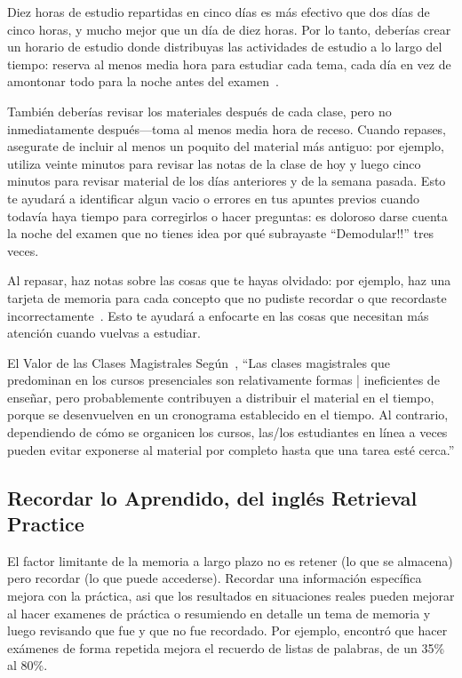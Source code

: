 Diez horas de estudio repartidas en cinco días
es más efectivo que dos días de cinco horas,
y mucho mejor que un día de diez horas.
Por lo tanto, deberías crear un horario de estudio donde distribuyas las actividades de estudio a lo largo del tiempo:
reserva al menos media hora para estudiar cada tema, cada día
en vez de amontonar todo para la noche antes del examen~\cite{Kang2016}.

También deberías revisar los materiales después de cada clase,
pero no inmediatamente después---toma al menos media hora de receso.
Cuando repases,
asegurate de incluir al menos un poquito del material más antiguo:
por ejemplo,
utiliza veinte minutos para revisar las notas de la clase de hoy
y luego cinco minutos para revisar material de los días anteriores
y de la semana pasada.
Esto te ayudará a identificar algun vacio o errores en tus apuntes previos
cuando todavía haya tiempo para corregirlos o hacer preguntas:
es doloroso darse cuenta la noche del examen
que no tienes idea por qué subrayaste ``Demodular!!'' tres veces.

Al repasar,
haz notas sobre las cosas que te hayas olvidado:
por ejemplo,
haz una tarjeta de memoria para cada concepto que no pudiste recordar
o que recordaste incorrectamente~\cite{Matt2019}.
Esto te ayudará a enfocarte en las cosas que necesitan más atención cuando vuelvas a estudiar.

\begin{aside}{El Valor de las Clases Magistrales}
  Según~\cite{Mill2016a},
  ``Las clases magistrales que predominan en los cursos presenciales son relativamente formas     |   ineficientes de enseñar,
  pero probablemente contribuyen a distribuir el material en el tiempo,
  porque se desenvuelven en un cronograma establecido en el tiempo.
  Al contrario,
  dependiendo de cómo se organicen los cursos,
  las/los estudiantes en línea a veces pueden evitar exponerse al material por completo hasta que una     tarea esté cerca.''
\end{aside}

\subsection*{Recordar lo Aprendido, del inglés Retrieval Practice}

El factor limitante de la memoria a largo plazo no es retener (lo que se almacena)
pero recordar (lo que puede accederse).
Recordar una información específica mejora con la práctica,
asi que los resultados en situaciones reales pueden mejorar
al hacer examenes de práctica o resumiendo en detalle un tema de memoria
y luego revisando que fue y que no fue recordado.
Por ejemplo,
\cite{Karp2008} encontró que hacer exámenes de forma repetida mejora el recuerdo de listas de palabras, de un 35\% al 80\%.

